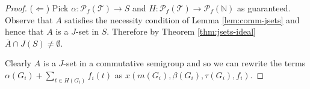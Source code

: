 \documentclass[12pt,showtrims]{memoir}
\theoremstyle{plain}
\theoremstyle{definition}
\newcommand{\bbN}{\mathbb{N}}
\newcommand{\calT}{\mathcal{T}}
\newcommand{\Pf}{\mathcal{P}_f}
\begin{document}
\begin{proof}
  ($\Leftarrow$)
  Pick $\alpha \colon \Pf(\calT) \to S$ and $H \colon \Pf(\calT) \to \Pf(\bbN)$ as guaranteed. 
  Observe that $A$ satisfies the necessity condition of Lemma \ref{lem:comm-jsets} and hence that $A$ is a $J$-set in $S$. 
  Therefore by Theorem \ref{thm:jsets-ideal} $\overline{A} \cap J(S) \ne \emptyset$.

  Clearly $A$ is a $J$-set in a commutative semigroup and so we can rewrite the terms $\alpha(G_i) + \sum_{t \in H(G_i)} f_i(t)$ as $x(m(G_i), \beta(G_i), \tau(G_i), f_i)$. 
\end{proof}





\end{document}
